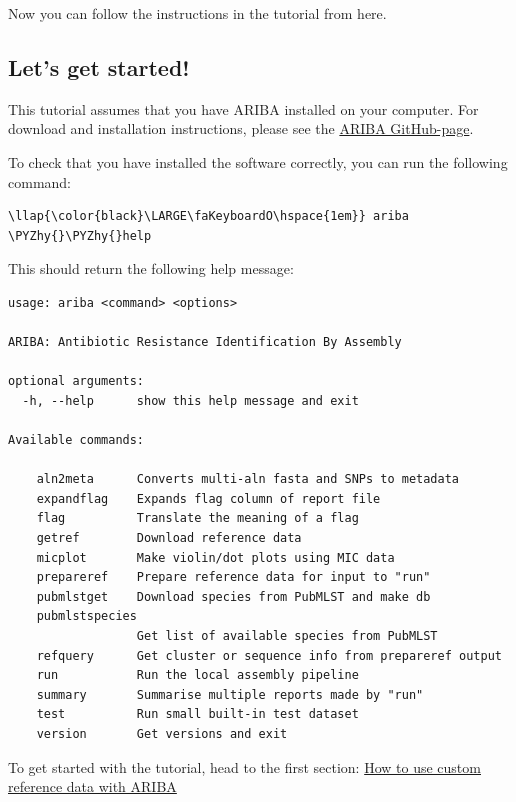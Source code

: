 \documentclass[11pt]{article}
\def\PYZhy{\char`\-}
\begin{document}
Now you can follow the instructions in the tutorial from here.

\hypertarget{lets-get-started}{%
\subsection{Let's get started!}\label{lets-get-started}}

This tutorial assumes that you have ARIBA installed on your computer.
For download and installation instructions, please see the
\href{https://github.com/sanger-pathogens/ariba}{ARIBA GitHub-page}.

To check that you have installed the software correctly, you can run the
following command:

\begin{terminalinput}
\begin{Verbatim}[commandchars=\\\{\}]
\llap{\color{black}\LARGE\faKeyboardO\hspace{1em}} ariba \PYZhy{}\PYZhy{}help
\end{Verbatim}
\end{terminalinput}

    This should return the following help message:


\newpage


\begin{verbatim}
usage: ariba <command> <options>

ARIBA: Antibiotic Resistance Identification By Assembly

optional arguments:
  -h, --help      show this help message and exit

Available commands:

    aln2meta      Converts multi-aln fasta and SNPs to metadata
    expandflag    Expands flag column of report file
    flag          Translate the meaning of a flag
    getref        Download reference data
    micplot       Make violin/dot plots using MIC data
    prepareref    Prepare reference data for input to "run"
    pubmlstget    Download species from PubMLST and make db
    pubmlstspecies
                  Get list of available species from PubMLST
    refquery      Get cluster or sequence info from prepareref output
    run           Run the local assembly pipeline
    summary       Summarise multiple reports made by "run"
    test          Run small built-in test dataset
    version       Get versions and exit
\end{verbatim}

To get started with the tutorial, head to the first section:
\href{make_custom_db.ipynb}{How to use custom reference data with ARIBA}
\end{document}
